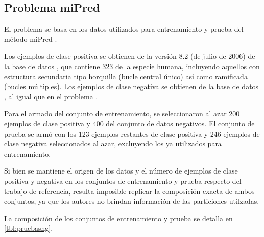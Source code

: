 %
%
\subsection{Problema miPred}
%
El problema \mipred{} se basa en los datos utilizados para
entrenamiento y prueba del método miPred \cite{ng}.

Los ejemplos de clase positiva se obtienen de la versión 8.2 (de julio
de 2006) de la base de datos , que contiene 323
 de la especie humana, incluyendo aquellos con estructura
secundaria tipo horquilla (bucle central único) así como ramificada
(bucles múltiples).
Los ejemplos de clase negativa se obtienen de la base de datos
, al igual que en el problema \tripletsvm{}.

Para el armado del conjunto de entrenamiento, se seleccionaron al azar
200 ejemplos de clase positiva y 400 del conjunto de datos negativos.
El conjunto de prueba se armó con los 123 ejemplos restantes de clase
positiva y 246 ejemplos de clase negativa seleccionados al azar,
excluyendo los ya utilizados para entrenamiento.

Si bien se mantiene el origen de los datos y el número de ejemplos de
clase positiva y negativa en los conjuntos de entrenamiento y prueba
respecto del trabajo de referencia, resulta imposible replicar la
composición exacta de ambos conjuntos, ya que los autores no brindan
información de las particiones utilzadas.


La composición de los conjuntos de entrenamiento y prueba se detalla
en \autoref{tbl:pruebasng}.
